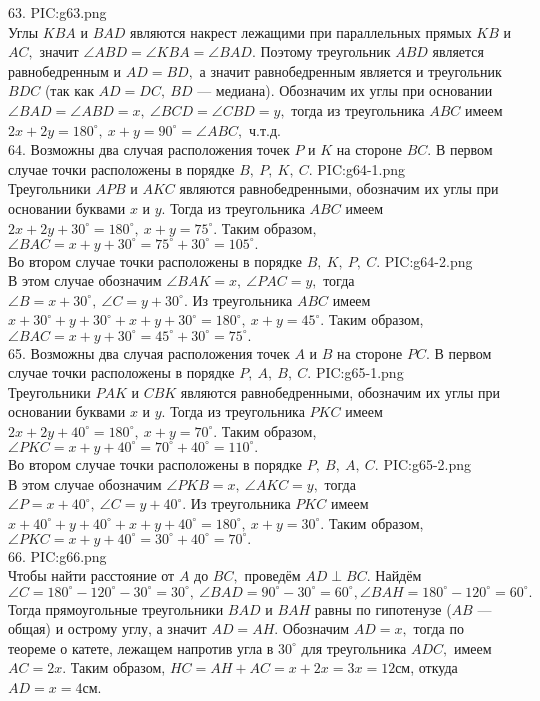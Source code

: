 63. {{PIC:g63.png}}\\
Углы $KBA$ и $BAD$ являются накрест лежащими при параллельных прямых $KB$ и $AC,$ значит $\angle ABD=\angle KBA=\angle BAD.$ Поэтому треугольник $ABD$ является равнобедренным и $AD=BD,$ а значит равнобедренным является и треугольник $BDC$ (так как $AD=DC,\ BD$ --- медиана). Обозначим их углы при основании $\angle BAD=\angle ABD=x,\ \angle BCD=\angle CBD=y,$ тогда из треугольника $ABC$ имеем $2x+2y=180^\circ,\ x+y=90^\circ=\angle ABC,$ ч.т.д.\\
64. Возможны два случая расположения точек $P$ и $K$ на стороне $BC.$ В первом случае точки расположены в порядке $B,\ P,\ K,\ C.$
{{PIC:g64-1.png}}\\
Треугольники $APB$ и $AKC$ являются равнобедренными, обозначим их углы при основании буквами $x$ и $y.$ Тогда из треугольника $ABC$ имеем $2x+2y+30^\circ=180^\circ,\ x+y=75^\circ.$ Таким образом, $\angle BAC=x+y+30^\circ=75^\circ+30^\circ=105^\circ.$\\
Во втором случае точки расположены в порядке $B,\ K,\ P,\ C.$
{{PIC:g64-2.png}}\\
В этом случае обозначим $\angle BAK=x,\ \angle PAC=y,$ тогда $\angle B=x+30^\circ,\ \angle C=y+30^\circ.$ Из треугольника $ABC$ имеем $x+30^\circ+y+30^\circ+x+y+30^\circ=180^\circ,\ x+y=45^\circ.$ Таким образом, $\angle BAC=x+y+30^\circ=45^\circ+30^\circ=75^\circ.$\\
65. Возможны два случая расположения точек $A$ и $B$ на стороне $PC.$ В первом случае точки расположены в порядке $P,\ A,\ B,\ C.$
{{PIC:g65-1.png}}\\
Треугольники $PAK$ и $CBK$ являются равнобедренными, обозначим их углы при основании буквами $x$ и $y.$ Тогда из треугольника $PKC$ имеем $2x+2y+40^\circ=180^\circ,\ x+y=70^\circ.$ Таким образом, $\angle PKC=x+y+40^\circ=70^\circ+40^\circ=110^\circ.$\\
Во втором случае точки расположены в порядке $P,\ B,\ A,\ C.$
{{PIC:g65-2.png}}\\
В этом случае обозначим $\angle PKB=x,\ \angle AKC=y,$ тогда $\angle P=x+40^\circ,\ \angle C=y+40^\circ.$ Из треугольника $PKC$ имеем $x+40^\circ+y+40^\circ+x+y+40^\circ=180^\circ,\ x+y=30^\circ.$ Таким образом, $\angle PKC=x+y+40^\circ=30^\circ+40^\circ=70^\circ.$\\
66. {{PIC:g66.png}}\\
Чтобы найти расстояние от $A$ до $BC,$ проведём $AD\perp BC.$ Найдём $\angle C=180^\circ-120^\circ-30^\circ=30^\circ,\ \angle BAD=90^\circ-30^\circ=60^\circ, \angle BAH=180^\circ-120^\circ=60^\circ.$ Тогда прямоугольные треугольники $BAD$ и $BAH$ равны по гипотенузе ($AB$ --- общая) и острому углу, а значит $AD=AH.$ Обозначим $AD=x,$ тогда по теореме о катете, лежащем напротив угла в $30^\circ$ для треугольника $ADC,$ имеем $AC=2x.$ Таким образом, $HC=AH+AC=x+2x=3x=12$см, откуда $AD=x=4$см.\\
